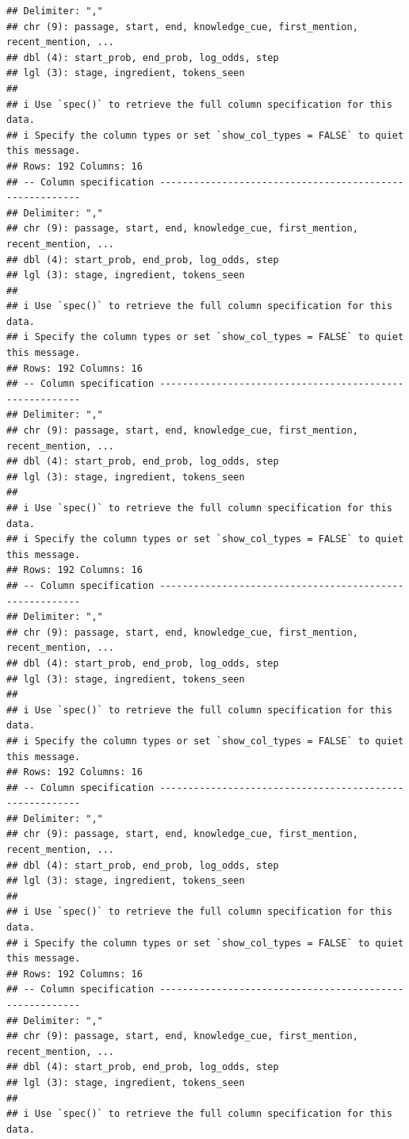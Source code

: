\documentclass[
]{article}
\begin{document}
\begin{verbatim}
## Delimiter: ","
## chr (9): passage, start, end, knowledge_cue, first_mention, recent_mention, ...
## dbl (4): start_prob, end_prob, log_odds, step
## lgl (3): stage, ingredient, tokens_seen
## 
## i Use `spec()` to retrieve the full column specification for this data.
## i Specify the column types or set `show_col_types = FALSE` to quiet this message.
## Rows: 192 Columns: 16
## -- Column specification --------------------------------------------------------
## Delimiter: ","
## chr (9): passage, start, end, knowledge_cue, first_mention, recent_mention, ...
## dbl (4): start_prob, end_prob, log_odds, step
## lgl (3): stage, ingredient, tokens_seen
## 
## i Use `spec()` to retrieve the full column specification for this data.
## i Specify the column types or set `show_col_types = FALSE` to quiet this message.
## Rows: 192 Columns: 16
## -- Column specification --------------------------------------------------------
## Delimiter: ","
## chr (9): passage, start, end, knowledge_cue, first_mention, recent_mention, ...
## dbl (4): start_prob, end_prob, log_odds, step
## lgl (3): stage, ingredient, tokens_seen
## 
## i Use `spec()` to retrieve the full column specification for this data.
## i Specify the column types or set `show_col_types = FALSE` to quiet this message.
## Rows: 192 Columns: 16
## -- Column specification --------------------------------------------------------
## Delimiter: ","
## chr (9): passage, start, end, knowledge_cue, first_mention, recent_mention, ...
## dbl (4): start_prob, end_prob, log_odds, step
## lgl (3): stage, ingredient, tokens_seen
## 
## i Use `spec()` to retrieve the full column specification for this data.
## i Specify the column types or set `show_col_types = FALSE` to quiet this message.
## Rows: 192 Columns: 16
## -- Column specification --------------------------------------------------------
## Delimiter: ","
## chr (9): passage, start, end, knowledge_cue, first_mention, recent_mention, ...
## dbl (4): start_prob, end_prob, log_odds, step
## lgl (3): stage, ingredient, tokens_seen
## 
## i Use `spec()` to retrieve the full column specification for this data.
## i Specify the column types or set `show_col_types = FALSE` to quiet this message.
## Rows: 192 Columns: 16
## -- Column specification --------------------------------------------------------
## Delimiter: ","
## chr (9): passage, start, end, knowledge_cue, first_mention, recent_mention, ...
## dbl (4): start_prob, end_prob, log_odds, step
## lgl (3): stage, ingredient, tokens_seen
## 
## i Use `spec()` to retrieve the full column specification for this data.

\end{verbatim}
\end{document}
